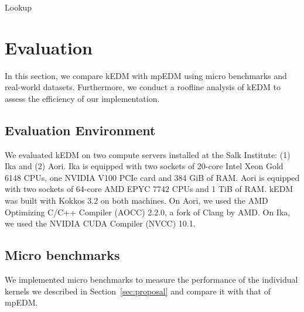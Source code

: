 \documentclass[sigconf]{acmart}
\begin{document}
\begin{algorithm}
    \SetAlgoLined
    \DontPrintSemicolon
    \caption{Lookup}%
    \label{alg:lookup}
\end{algorithm}

\section{Evaluation}\label{sec:evaluation}

In this section, we compare kEDM with mpEDM using micro benchmarks and
real-world datasets. Furthermore, we conduct a roofline analysis of kEDM to
assess the efficiency of our implementation.

\subsection{Evaluation Environment}


We evaluated kEDM on two compute servers installed at the Salk Institute: (1)
Ika and (2) Aori. Ika is equipped with two sockets of 20-core Intel Xeon Gold
6148 CPUs, one NVIDIA V100 PCIe card and 384 GiB of RAM\@. Aori is equipped with
two sockets of 64-core AMD EPYC 7742 CPUs and 1 TiB of RAM\@. kEDM was built
with Kokkos 3.2 on both machines. On Aori, we used the AMD Optimizing C/C++
Compiler (AOCC) 2.2.0, a fork of Clang by AMD. On Ika, we used the NVIDIA CUDA
Compiler (NVCC) 10.1.

\subsection{Micro benchmarks}

We implemented micro benchmarks to measure the performance of the individual
kernels we described in Section~\ref{sec:proposal} and compare it with that of
mpEDM\@.
\end{document}
